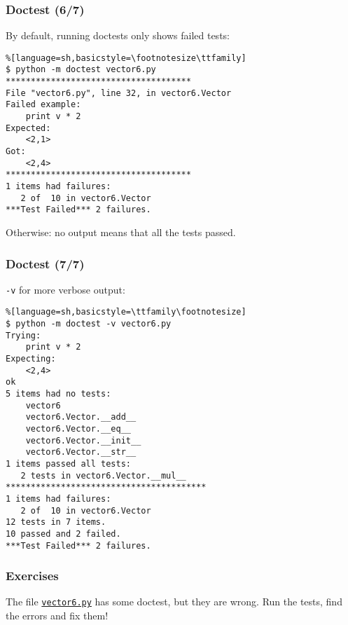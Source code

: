 \begin{frame}[fragile]\frametitle{Doctest (6/7)}

  By default, running doctests only shows failed tests:
\begin{lstlisting}%[language=sh,basicstyle=\footnotesize\ttfamily]
$ python -m doctest vector6.py
*************************************
File "vector6.py", line 32, in vector6.Vector
Failed example:
    print v * 2
Expected:
    <2,1>
Got:
    <2,4>
*************************************
1 items had failures:
   2 of  10 in vector6.Vector
***Test Failed*** 2 failures.
\end{lstlisting}
  Otherwise: no output means that all the tests passed.
\end{frame}

\begin{frame}[fragile]\frametitle{Doctest (7/7)}

\texttt{-v} for more verbose output:
\begin{lstlisting}%[language=sh,basicstyle=\ttfamily\footnotesize]
$ python -m doctest -v vector6.py
Trying:
    print v * 2
Expecting:
    <2,4>
ok
5 items had no tests:
    vector6
    vector6.Vector.__add__
    vector6.Vector.__eq__
    vector6.Vector.__init__
    vector6.Vector.__str__
1 items passed all tests:
   2 tests in vector6.Vector.__mul__
****************************************
1 items had failures:
   2 of  10 in vector6.Vector
12 tests in 7 items.
10 passed and 2 failed.
***Test Failed*** 2 failures.
\end{lstlisting}
\end{frame}

\begin{frame}[fragile]\frametitle{Exercises}
  The file
  \href{https://raw.github.com/gc3-uzh-ch/python-course/master/vector6.py}{\texttt{vector6.py}}
  has some doctest, but they are wrong. Run the tests, find the errors
  and fix them!

\end{frame}

